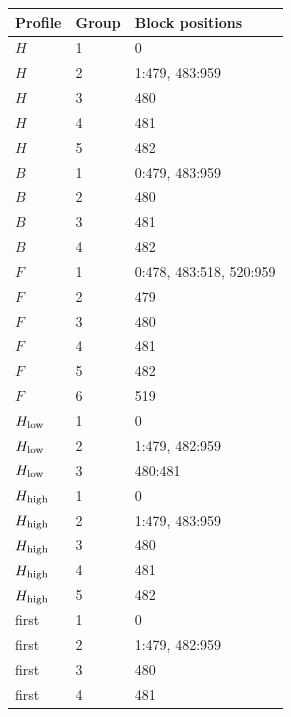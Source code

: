 \begin{longtable}{@{}llp{3.7in}@{}}
\toprule Profile & Group & Block positions\\\midrule\endhead
$H$ & 1 & 0\\
$H$ & 2 & 1:479, 483:959\\
$H$ & 3 & 480\\
$H$ & 4 & 481\\
$H$ & 5 & 482\\
$B$ & 1 & 0:479, 483:959\\
$B$ & 2 & 480\\
$B$ & 3 & 481\\
$B$ & 4 & 482\\
$F$ & 1 & 0:478, 483:518, 520:959\\
$F$ & 2 & 479\\
$F$ & 3 & 480\\
$F$ & 4 & 481\\
$F$ & 5 & 482\\
$F$ & 6 & 519\\
$H_{\rm low}$ & 1 & 0\\
$H_{\rm low}$ & 2 & 1:479, 482:959\\
$H_{\rm low}$ & 3 & 480:481\\
$H_{\rm high}$ & 1 & 0\\
$H_{\rm high}$ & 2 & 1:479, 483:959\\
$H_{\rm high}$ & 3 & 480\\
$H_{\rm high}$ & 4 & 481\\
$H_{\rm high}$ & 5 & 482\\
first & 1 & 0\\
first & 2 & 1:479, 482:959\\
first & 3 & 480\\
first & 4 & 481\\
\bottomrule\end{longtable}
